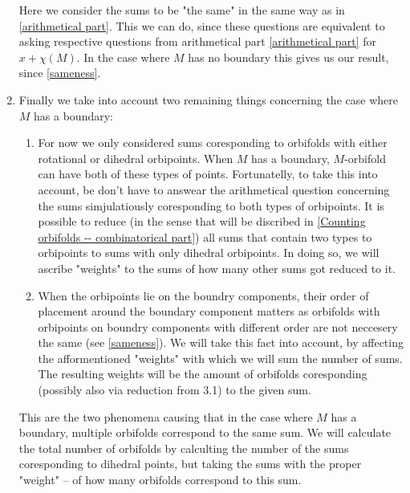 \begin{enumerate}
Here we consider the sums to be "the same" in the same way as in \ref{arithmetical part}.
This we can do, since these questions are equivalent to asking respective questions 
from arithmetical 
part \ref{arithmetical part} for $x + \chi(M)$. 
In the case where $M$ has no boundary this gives us our result, since \ref{sameness}. 
\item Finally we take into account two remaining things concerning the case 
where $M$ has a boundary:
\begin{enumerate}
\item\label{additional things in boundary case -- rotational} 
For now we only considered sums coresponding to 
orbifolds with either rotational or dihedral orbipoints. 
When $M$ has a boundary, $M$-orbifold can have both of these types of points. 
Fortunatelly, to take this into account, be don't have to answear the 
arithmetical question concerning the sums simjulatiously coresponding to both types 
of orbipoints. It is possible to reduce (in the sense that will 
be discribed in \ref{Counting orbifolds -- combinatorical part}) all sums 
that contain two types to orbipoints to sums with only dihedral orbipoints. 
In doing so, we will ascribe "weights" to the sums of how many other sums 
got reduced to it. 

\item When the orbipoints lie on the boundry components, their 
order of placement around the boundary component matters as orbifolds 
with orbipoints on boundry components with different order 
are not neccesery the same (see \ref{sameness}). We will take this fact into account, 
by affecting the afformentioned "weights" with which we will sum the number of sums. The 
resulting weights will be the amount of orbifolds coresponding (possibly also via reduction 
from 3.1) 
to the given sum. 

\end{enumerate}
This are the two phenomena causing 
that 
in the case 
where $M$ has a boundary, multiple orbifolds correspond to the same sum. 
We will calculate the total number of orbifolds by calculting the number 
of the sums coresponding to dihedral points, but taking the sums with the proper "weight" 
-- of how many orbifolds correspond to this sum.
\end{enumerate}

